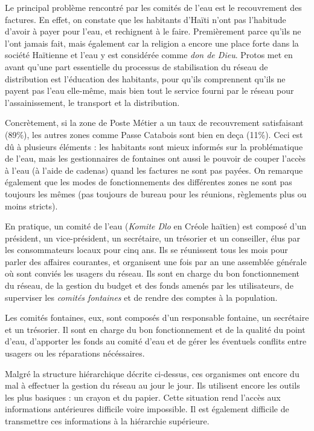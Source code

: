 \documentclass{EPL-master-thesis-covers-FR}
\begin{document}
    			Le principal problème rencontré par les comités de l'eau est le recouvrement des factures. En effet, on constate que les habitants d'Haïti n'ont pas l'habitude d'avoir à payer pour l'eau, et rechignent à le faire. Premièrement parce qu'ils ne l'ont jamais fait, mais également car la religion a encore une place forte dans la société Haïtienne et l'eau y est considérée comme \emph{don de Dieu}. Protos met en avant qu'une part essentielle du processus de stabilisation du réseau de distribution est l'éducation des habitants, pour qu'ils comprennent qu'ils ne payent pas l'eau elle-même, mais bien tout le service fourni par le réseau pour l'assainissement, le transport et la distribution.

    			Concrètement, si la zone de Poste Métier a un taux de recouvrement satisfaisant (89\%), les autres zones comme Passe Catabois sont bien en deça (11\%). Ceci est dû à plusieurs éléments : les habitants sont mieux informés sur la problématique de l'eau, mais les gestionnaires de fontaines ont aussi le pouvoir de couper l'accès à l'eau (à l'aide de cadenas) quand les factures ne sont pas payées. On remarque également que les modes de fonctionnements des différentes zones ne sont pas toujours les mêmes (pas toujours de bureau pour les réunions, règlements plus ou moins stricts).

    			En pratique, un comité de l'eau (\emph{Komite Dlo} en Créole haïtien) est composé d'un président, un vice-président, un secrétaire, un trésorier et un conseiller, élus par les consommateurs locaux pour cinq ans. Ils se réunissent tous les mois pour parler des affaires courantes, et organisent une fois par an une assemblée générale où sont conviés les usagers du réseau. Ils sont en charge du bon fonctionnement du réseau, de la gestion du budget et des fonds amenés par les utilisateurs, de superviser les \emph{comités fontaines} et de rendre des comptes à la population.

    			Les comités fontaines, eux, sont composés d'un responsable fontaine, un secrétaire et un trésorier. Il sont en charge du bon fonctionnement et de la qualité du point d'eau, d'apporter les fonds au comité d'eau et de gérer les éventuels conflits entre usagers ou les réparations nécéssaires.

    			Malgré la structure hiérarchique décrite ci-dessus, ces organismes ont encore du mal à effectuer la gestion du réseau au jour le jour. Ils utilisent encore les outils les plus basiques : un crayon et du papier. Cette situation rend l'accès aux informations antérieures difficile voire impossible. Il est également difficile de transmettre ces informations à la hiérarchie supérieure.
\end{document}
